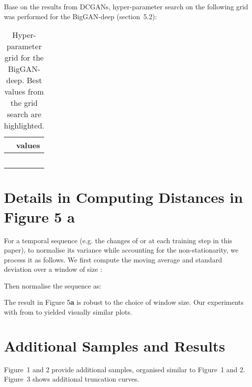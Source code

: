 \documentclass{article} \usepackage{iclr2020_conference,times}
\begin{document}
Base on the results from DCGANs, hyper-parameter search on the following grid was performed for the BigGAN-deep (section~5.2):
\begin{table}[htb]
\caption{Hyper-parameter grid for the BigGAN-deep. Best values from the grid search are highlighted.}
\begin{center}
\begin{tabular}{l|c}
         & values \\
\hline
  &  \\
  &  \\
  &  \\
 &  \\
  &  \\
\end{tabular}
\end{center}
\end{table}

\section{Details in Computing Distances in Figure 5 \textbf{a}}
\label{app:comp-distance}

For a temporal sequence  (e.g. the changes of  or  at each training step in this paper),
to normalise its variance while accounting for the non-stationarity, we process it as follows. We first compute the moving average and standard deviation over a window of size :

Then normalise the sequence as:

The result in Figure 5\textbf{a} is robust to the choice of window size. Our experiments with  from  to  yielded visually similar plots.

\section{Additional Samples and Results}
\label{app:samples_and_truncation}

Figure~1 and 2 provide additional samples, organised similar to Figure~1 and 2. Figure~3 shows additional truncation curves.
\end{document}

